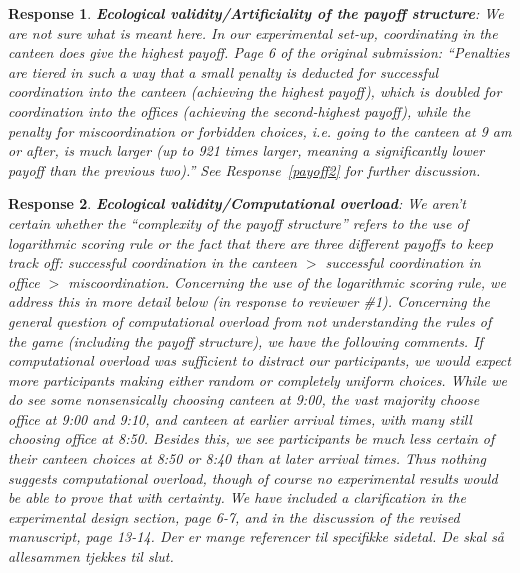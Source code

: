 \documentclass[a4paper]{article}
\newtheorem{response}{Response}
\newenvironment{tobo}{\smallskip \noindent \color{yellow!80!black!80}}{\color{black}\smallskip}
\begin{document}
\begin{response}\label{payoff1}
{\bfseries Ecological validity/Artificiality of the payoff structure}: 
We are not sure what is meant here. In our experimental set-up, coordinating in the canteen \emph{does} give the highest payoff. Page 6 of the original submission: ``Penalties are tiered in such a way that a small penalty is deducted for successful coordination into the canteen (achieving the highest payoff), which is doubled for coordination into the offices (achieving the second-highest payoff), while the penalty for miscoordination or forbidden choices, i.e. going to the canteen at 9 am or after, is much larger (up to 921 times larger, meaning a significantly lower payoff than the previous two).'' See Response~\ref{payoff2} for further discussion.
\end{response}
\begin{response}\label{overload1}
{\bfseries Ecological validity/Computational overload}: We aren't certain whether the ``complexity of the payoff structure'' refers to the use of logarithmic scoring rule or the fact that there are three different payoffs to keep track off: successful coordination in the canteen $>$ successful coordination in office $>$ miscoordination. Concerning the use of the logarithmic scoring rule, we address this in more detail below (in response to reviewer \#1). Concerning the general question of computational overload from not understanding the rules of the game (including the payoff structure), we have the following comments. If computational overload was sufficient to distract our participants, we would expect more participants making either random or completely uniform choices. While we do see some nonsensically choosing canteen at 9:00, the vast majority choose office at 9:00 and 9:10, and canteen at earlier arrival times, with many still choosing office at 8:50. Besides this, we see participants be much less certain of their canteen choices at 8:50 or 8:40 than at later arrival times. Thus nothing suggests computational overload, though of course no experimental results would be able to prove that with certainty. We have included a clarification in the experimental design section, page 6-7, and in the discussion of the revised manuscript, page 13-14. 
\begin{tobo}
Der er mange referencer til specifikke sidetal. De skal så allesammen tjekkes til slut.
\end{tobo}
 \end{response}
\end{document}
